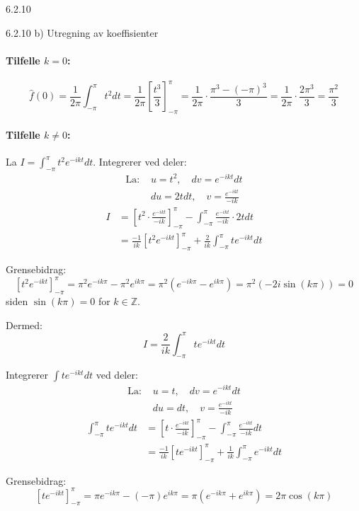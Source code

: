 \documentclass[a4paper,norsk]{article}
\begin{document}
\begin{oppgavebox}{6.2.10}{}
\begin{proofbox}{6.2.10 b)}{}
Utregning av koeffisienter

\paragraph{Tilfelle $k = 0$:}
\[
\hat{f}(0) = \frac{1}{2\pi} \int_{-\pi}^{\pi} t^2  dt 
= \frac{1}{2\pi} \left[ \frac{t^3}{3} \right]_{-\pi}^{\pi}
= \frac{1}{2\pi} \cdot \frac{\pi^3 - (-\pi)^3}{3}
= \frac{1}{2\pi} \cdot \frac{2\pi^3}{3}
= \frac{\pi^2}{3}
\]

\paragraph{Tilfelle $k \neq 0$:}
La $I = \int_{-\pi}^{\pi} t^2 e^{-ikt}  dt$. Integrerer ved deler:
\begin{align*}
\text{La: } & u = t^2, \quad dv = e^{-ikt}dt \\
& du = 2tdt, \quad v = \frac{e^{-ikt}}{-ik}
\end{align*}
\begin{align*}
I &= \left[ t^2 \cdot \frac{e^{-ikt}}{-ik} \right]_{-\pi}^{\pi} 
   - \int_{-\pi}^{\pi} \frac{e^{-ikt}}{-ik} \cdot 2t  dt \\
&= \frac{-1}{ik} \left[ t^2 e^{-ikt} \right]_{-\pi}^{\pi} 
   + \frac{2}{ik} \int_{-\pi}^{\pi} t e^{-ikt}  dt
\end{align*}

Grensebidrag:
\[
\left[ t^2 e^{-ikt} \right]_{-\pi}^{\pi} = \pi^2 e^{-ik\pi} - \pi^2 e^{ik\pi} 
= \pi^2(e^{-ik\pi} - e^{ik\pi}) = \pi^2(-2i\sin(k\pi)) = 0
\]
siden $\sin(k\pi) = 0$ for $k \in \mathbb{Z}$.

Dermed:
\[
I = \frac{2}{ik} \int_{-\pi}^{\pi} t e^{-ikt}  dt
\]

Integrerer $\int t e^{-ikt}  dt$ ved deler:
\begin{align*}
\text{La: } & u = t, \quad dv = e^{-ikt}dt \\
& du = dt, \quad v = \frac{e^{-ikt}}{-ik}
\end{align*}
\begin{align*}
\int_{-\pi}^{\pi} t e^{-ikt}  dt &= \left[ t \cdot \frac{e^{-ikt}}{-ik} \right]_{-\pi}^{\pi} 
- \int_{-\pi}^{\pi} \frac{e^{-ikt}}{-ik}  dt \\
&= \frac{-1}{ik} \left[ t e^{-ikt} \right]_{-\pi}^{\pi} 
+ \frac{1}{ik} \int_{-\pi}^{\pi} e^{-ikt}  dt
\end{align*}

Grensebidrag:
\[
\left[ t e^{-ikt} \right]_{-\pi}^{\pi} = \pi e^{-ik\pi} - (-\pi)e^{ik\pi} 
= \pi(e^{-ik\pi} + e^{ik\pi}) = 2\pi\cos(k\pi)
\]


\end{proofbox}
\end{oppgavebox}
\end{document}
